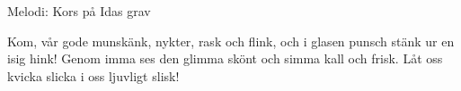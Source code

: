 \begin{song}

\begin{songmeta}
Melodi: Kors på Idas grav
\end{songmeta}

\begin{songtext}
Kom, vår gode munskänk, nykter, rask och flink,
och i glasen punsch stänk ur en isig hink!
Genom imma ses den glimma
skönt och simma kall och frisk.
Låt oss kvicka slicka i oss ljuvligt slisk!
\end{songtext}
\end{song}
